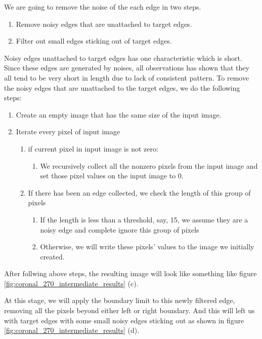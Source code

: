 We are going to remove the noise of the each edge in two steps. 
\begin{enumerate}
  \item Remove noisy edges that are unattached to target edges.
  \item Filter out small edges sticking out of target edges. 
\end{enumerate}

Noisy edges unattached to target edges has one characteristic which is short. Since these edges are generated
by noises, all observations has shown that they all tend to be very short in length due to lack of consistent
pattern. To remove the noisy edges that are unattached to the target edges, we do the following steps:
\begin{enumerate}
  \item Create an empty image that has the same size of the input image.
  \item Iterate every pixel of input image
    \begin{enumerate}
      \item if current pixel in input image is not zero:
        \begin{enumerate}
          \item We recursively collect all the nonzero pixels from the input image and set those pixel values on
            the input image to 0.
        \end{enumerate}
      \item If there has been an edge collected, we check the length of this group of pixels
        \begin{enumerate}
          \item If the length is less than a threshold, say, 15, we assume they are a noisy edge and 
            complete ignore this group of pixels
          \item Otherwise, we will write these pixels' values to the image we initially created.
        \end{enumerate}
    \end{enumerate}
\end{enumerate}

After follwing above steps, the resulting image will look like something like figure 
\ref{fig:coronal_270_intermediate_results} (c).

At this stage, we will apply the boundary limit to this newly filtered edge, removing all the pixels beyond
either left or right boundary. And this will left us with target edges with some small noisy edges sticking
out as shown in figure \ref{fig:coronal_270_intermediate_results} (d).

